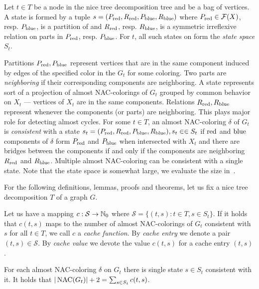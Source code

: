%
\begin{definition}
	Let \( t \in T \) be a node in the nice tree decomposition tree and
	\Xt{} be a bag of vertices.
	A state is formed by a tuple \( s = (P_{\text{red}}, R_{\text{red}}, P_{\text{blue}}, R_{\text{blue}}) \)
	where \( P_{\text{red}} \in \mathcal{F}(X)\), resp. \( P_{\text{blue}} \), is a partition of \Xt{}
	and \( R_{\text{red}}\), resp. \(R_{\text{blue}} \), is a symmetric irreflexive relation
	on parts in \( P_{\text{red}}\), resp. \(P_{\text{blue}} \).
	For \( t \), all such states on \Xt{} form the \emph{state space} \( S_t \).
\end{definition}
%
Partitions \( P_{\text{red}}, P_{\text{blue}} \) represent vertices
that are in the same component induced by edges of the specified color
in the \( G_t \) for some coloring.
Two parts are \emph{neighboring} if their corresponding components are neighboring.
A state represents sort of a projection of almost NAC-colorings of \( G_t \)
grouped by common behavior on \( X_t \) --- vertices of \( X_t \) are in the same components.
%
Relations \( R_{\text{red}}, R_{\text{blue}} \) represent
whenever the components (or parts) are neighboring.
This plays major role for detecting almost cycles.
%
For some \( t \in T \),
an almost NAC-coloring \( \delta \) of \( G_t \)
is \emph{consistent} with a state \( s_t = (P_{\text{red}}, R_{\text{red}}, P_{\text{blue}}, R_{\text{blue}}), s_t \in \in S_t \)
if \( \text{red} \) and \( \text{blue} \) components of \( \delta \) form \( P_{\text{red}} \) and \( P_{\text{blue}} \)
when intersected with \( X_t \) and
there are bridges between the components if and only if
the components are neighboring \( R_{\text{red}} \) and \( R_{\text{blue}} \).
Multiple almost NAC-coloring can be consistent with a single state.
%
Note that the state space is somewhat large, we evaluate the size in~.

For the following definitions, lemmas, proofs and theorems, let us fix
a nice tree decomposition \( T \) of a graph \( G \).
%
\begin{definition}
	Let us have a mapping \( c: \mathcal{S} \to \mathbb{N}_0 \)
	where \( \mathcal{S} = \{ (t,s): t \in T, s \in S_t \} \).
	If it holds that \( c(t, s) \) maps to the number of almost NAC-colorings of \( G_t \)
	consistent with \( s \) for all \( t \in T \),
	we call \( c \) a \emph{cache function}.
	By \emph{cache entry} we denote a pair \( (t, s) \in \mathcal{S} \).
	By \emph{cache value} we devote the value \( c(t, s) \) for a cache entry \( (t, s) \).
\end{definition}
%
\begin{observation}
	For each almost NAC-coloring \( \delta \) on \( G_t \)
	there is single state \( s \in S_t \) consistent with it.
	It holds that \( |\operatorname{NAC}(G_t)| + 2 = \sum_{s \in S_t} c(t, s) \).
\end{observation}

